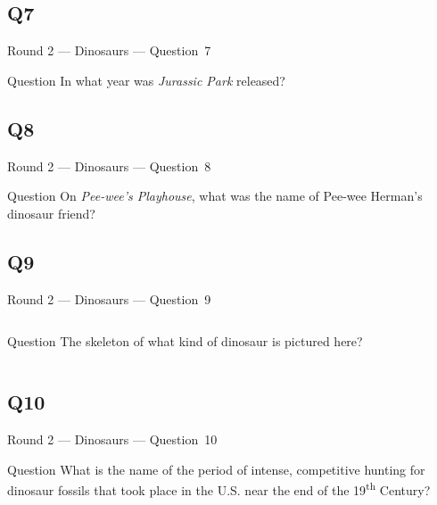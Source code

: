 \documentclass[11pt]{beamer}
\begin{document}
\subsection*{Q7}
\begin{frame}[t]{Round 2 --- Dinosaurs --- \mbox{Question 7}}
\vspace{-0.5em}
\begin{block}{Question}
In what year was \emph{Jurassic Park} released?
\end{block}
\end{frame}
\subsection*{Q8}
\begin{frame}[t]{Round 2 --- Dinosaurs --- \mbox{Question 8}}
\vspace{-0.5em}
\begin{block}{Question}
On \emph{Pee-wee's Playhouse}, what was the name of Pee-wee Herman's dinosaur friend?
\end{block}
\end{frame}
\subsection*{Q9}
\begin{frame}[t]{Round 2 --- Dinosaurs --- \mbox{Question 9}}
\vspace{-0.5em}
\begin{columns}[T,totalwidth=\linewidth]
\begin{column}{0.37\linewidth}
\begin{block}{Question}
The skeleton of what kind of dinosaur is pictured here?
\end{block}
\end{column}
\begin{column}{0.62\linewidth}
\begin{center}
\texttt{[image: \{Images/stego]}.jpg}
\end{center}
\end{column}
\end{columns}
\end{frame}
\subsection*{Q10}
\begin{frame}[t]{Round 2 --- Dinosaurs --- \mbox{Question 10}}
\vspace{-0.5em}
\begin{block}{Question}
What is the name of the period of intense, competitive hunting for dinosaur fossils that took place in the U.S. near the end of the 19\textsuperscript{th} Century?
\end{block}
\end{frame}
\end{document}
